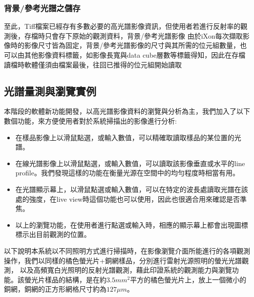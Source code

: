 \documentclass[12pt]{article}
\begin{document}
\subsubsection{背景/參考光譜之儲存}
至此，Tiff檔案已經存有多數必要的高光譜影像資訊，但使用者若進行反射率的觀測後，存檔時只會存下原始的觀測資料，背景/參考光譜影像
由於iXon每次擷取影像時的影像尺寸皆為固定，背景/參考光譜影像的尺寸與其所需的位元組數量，也可以由其他影像資料標籤，如影像長寬與data cube層數等標籤得知，因此在存檔
讀檔時軟體僅須由檔案最後，往回已推得的位元組開始讀取

\subsection{光譜量測與瀏覽實例}
本階段的軟體新功能開發，以高光譜影像資料的瀏覽與分析為主，我們加入了以下數個功能，來方便使用者對於系統掃描出的影像進行分析:
\begin{itemize}
    \item 在樣品影像上以滑鼠點選，或輸入數值，可以精確取讀取樣品的某位置的光譜。
    \item 在線光譜影像上以滑鼠點選，或輸入數值，可以讀取該影像垂直或水平的line profile。我們發現這樣的功能在衡量光源在空間中的均勻程度時相當有用。
    \item 在光譜顯示幕上，以滑鼠點選或輸入數值，可以在特定的波長處讀取光譜在該處的強度，在live view時這個功能也可以使用，因此也很適合用來確認是否準焦。
    \item 以上的瀏覽功能，在使用者進行點選或輸入時，相應的顯示幕上都會出現圖標標示出目前觀測的位置。
\end{itemize}
以下說明本系統以不同照明方式進行掃描時，在影像瀏覽介面所能進行的各項觀測操作，我們以同樣的橘色螢光片+銅網樣品，分別進行雷射光源照明的螢光光譜觀測，
以及高頻寬白光照明的反射光譜觀測，藉此印證系統的觀測能力與瀏覽功能。該螢光片樣品的結構，是在約$3.5mm^2$平方的橘色螢光片上，放上一個微小的銅網，銅網的正方形網格尺寸約為$127\mu m$。
\end{document}
